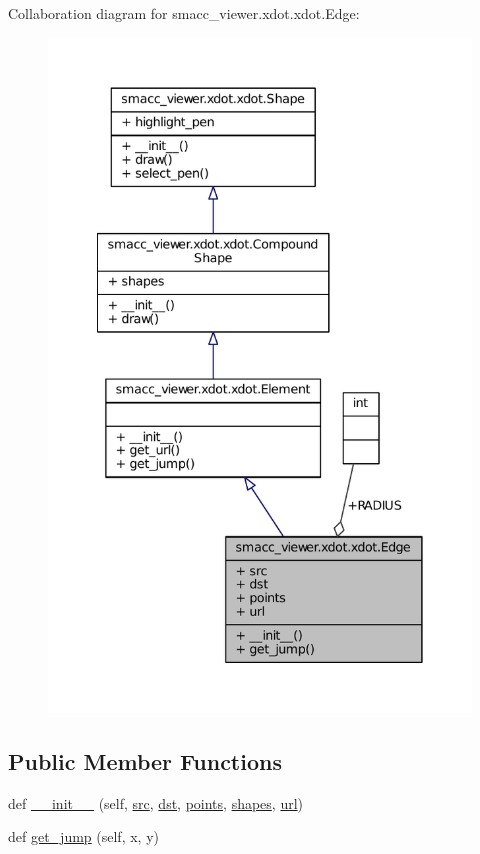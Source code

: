 Collaboration diagram for smacc\+\_\+viewer.\+xdot.\+xdot.\+Edge\+:
\nopagebreak
\begin{figure}[H]
\begin{center}
\leavevmode
\includegraphics[width=341pt]{classsmacc__viewer_1_1xdot_1_1xdot_1_1Edge__coll__graph}
\end{center}
\end{figure}
\subsection*{Public Member Functions}
\begin{DoxyCompactItemize}
\item 
def \hyperlink{classsmacc__viewer_1_1xdot_1_1xdot_1_1Edge_ae97d89d16e711625d1b2f4d894715d54}{\+\_\+\+\_\+init\+\_\+\+\_\+} (self, \hyperlink{classsmacc__viewer_1_1xdot_1_1xdot_1_1Edge_ae8c708b03328bc06b00d2cc30626e61c}{src}, \hyperlink{classsmacc__viewer_1_1xdot_1_1xdot_1_1Edge_a06202fe28435076ee948cae331614c6f}{dst}, \hyperlink{classsmacc__viewer_1_1xdot_1_1xdot_1_1Edge_ad3f042ee88c18f56adff36941ae9be3d}{points}, \hyperlink{classsmacc__viewer_1_1xdot_1_1xdot_1_1CompoundShape_af10de5e0141d75d95ad8b85cb7baf7ea}{shapes}, \hyperlink{classsmacc__viewer_1_1xdot_1_1xdot_1_1Edge_aa940458bc40062bd2e9857bc02102171}{url})
\item 
def \hyperlink{classsmacc__viewer_1_1xdot_1_1xdot_1_1Edge_a5c2391bfa8c8a6674b542131e47d1541}{get\+\_\+jump} (self, x, y)
\end{DoxyCompactItemize}
